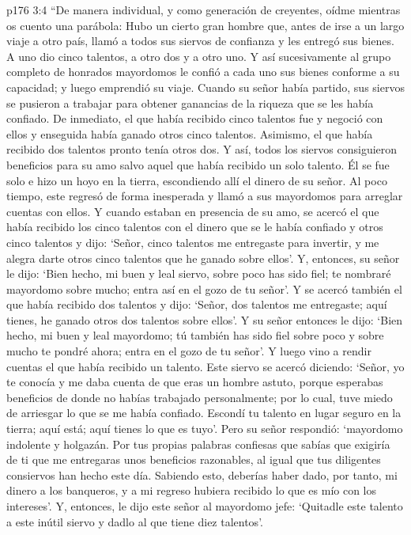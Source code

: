 \vs p176 3:4 “De manera individual, y como generación de creyentes, oídme mientras os cuento una parábola: Hubo un cierto gran hombre que, antes de irse a un largo viaje a otro país, llamó a todos sus siervos de confianza y les entregó sus bienes. A uno dio cinco talentos, a otro dos y a otro uno. Y así sucesivamente al grupo completo de honrados mayordomos le confió a cada uno sus bienes conforme a su capacidad; y luego emprendió su viaje. Cuando su señor había partido, sus siervos se pusieron a trabajar para obtener ganancias de la riqueza que se les había confiado. De inmediato, el que había recibido cinco talentos fue y negoció con ellos y enseguida había ganado otros cinco talentos. Asimismo, el que había recibido dos talentos pronto tenía otros dos. Y así, todos los siervos consiguieron beneficios para su amo salvo aquel que había recibido un solo talento. Él se fue solo e hizo un hoyo en la tierra, escondiendo allí el dinero de su señor. Al poco tiempo, este regresó de forma inesperada y llamó a sus mayordomos para arreglar cuentas con ellos. Y cuando estaban en presencia de su amo, se acercó el que había recibido los cinco talentos con el dinero que se le había confiado y otros cinco talentos y dijo: ‘Señor, cinco talentos me entregaste para invertir, y me alegra darte otros cinco talentos que he ganado sobre ellos’. Y, entonces, su señor le dijo: ‘Bien hecho, mi buen y leal siervo, sobre poco has sido fiel; te nombraré mayordomo sobre mucho; entra así en el gozo de tu señor’. Y se acercó también el que había recibido dos talentos y dijo: ‘Señor, dos talentos me entregaste; aquí tienes, he ganado otros dos talentos sobre ellos’. Y su señor entonces le dijo: ‘Bien hecho, mi buen y leal mayordomo; tú también has sido fiel sobre poco y sobre mucho te pondré ahora; entra en el gozo de tu señor’. Y luego vino a rendir cuentas el que había recibido un talento. Este siervo se acercó diciendo: ‘Señor, yo te conocía y me daba cuenta de que eras un hombre astuto, porque esperabas beneficios de donde no habías trabajado personalmente; por lo cual, tuve miedo de arriesgar lo que se me había confiado. Escondí tu talento en lugar seguro en la tierra; aquí está; aquí tienes lo que es tuyo’. Pero su señor respondió: ‘mayordomo indolente y holgazán. Por tus propias palabras confiesas que sabías que exigiría de ti que me entregaras unos beneficios razonables, al igual que tus diligentes consiervos han hecho este día. Sabiendo esto, deberías haber dado, por tanto, mi dinero a los banqueros, y a mi regreso hubiera recibido lo que es mío con los intereses’. Y, entonces, le dijo este señor al mayordomo jefe: ‘Quitadle este talento a este inútil siervo y dadlo al que tiene diez talentos’.
